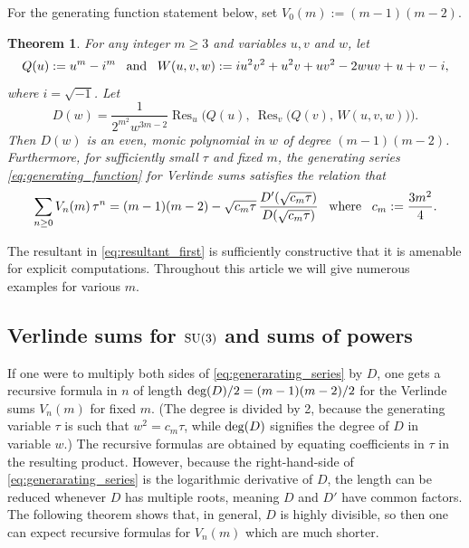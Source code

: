 \documentclass[11pt,reqno]{amsart}
\newtheorem{theorem}{Theorem}[section]
\theoremstyle{remark}
\DeclareMathOperator{\Res}{Res}
\begin{document}
For the generating function statement below, set $V_0(m):=(m-1)(m-2)$.

\begin{theorem}
\label{thm:mainb}
For any integer $m \geq 3$ and variables $u, v$ and $w$, let
\begin{equation}\label{eq:resultant_input}
Q(u):=u^m-i^m
\,\,\,\,\,
\text{\rm and}
\,\,\,\,\,
W(u,v,w) := iu^2v^2+u^2v+uv^2-2wuv+u+v-i,
\end{equation}
where $i=\sqrt{-1}$.   Let
\begin{equation}\label{eq:resultant_first}
D(w) = \frac{1}{2^{m^2}w^{3m-2}}\Res_u\Big(Q(u),\ \Res_v\big(Q(v),\,W(u,v,w)\big)\Big).
\end{equation}
Then $D(w)$ is an even, monic polynomial in $w$ of degree $(m-1)(m-2)$.  Furthermore,
for sufficiently small $\tau$ and fixed $m$, the
generating series \eqref{eq:generating_function} for Verlinde sums satisfies the relation that
\begin{equation}
\label{eq:generarating_series}
\sum_{n\ge0} V_n(m)\,\tau^n = (m-1)(m-2) - \sqrt{c_m\tau}\,\frac{D'(\sqrt{c_m\tau})}{D(\sqrt{c_m\tau})}
\,\,\,\,\,
\text{\rm where}
\,\,\,\,\,
c_m:=\frac{3m^2}{4}.
\end{equation}
\end{theorem}

The resultant in \eqref{eq:resultant_first} is sufficiently constructive that it is amenable for
explicit computations.  Throughout this article we will give numerous examples for various $m$.

\subsection{Verlinde sums for \texorpdfstring{$\text{\rm SU}(3)$}{SU(3)} and sums of powers}

If one were to multiply both sides of \eqref{eq:generarating_series} by $D$, one gets a recursive formula in $n$
of length $\textrm{\rm deg}(D)/2 = (m-1)(m-2)/2$ for the Verlinde sums $V_{n}(m)$ for fixed $m$. (The degree is divided by 2, because the generating variable $\tau$ is such that $w^2=c_m\tau$, while $\textrm{\rm deg}(D)$ signifies the degree of $D$ in variable $w$.) The recursive formulas are
obtained by equating coefficients in $\tau$ in the resulting product.  However, because
the right-hand-side of \eqref{eq:generarating_series} is the logarithmic derivative of $D$, the length can be
reduced whenever $D$ has multiple roots, meaning $D$ and $D'$ have common factors.
The following theorem shows that, in general, $D$ is highly divisible,
so then one can expect recursive formulas for $V_{n}(m)$ which are much shorter.
\end{document}
